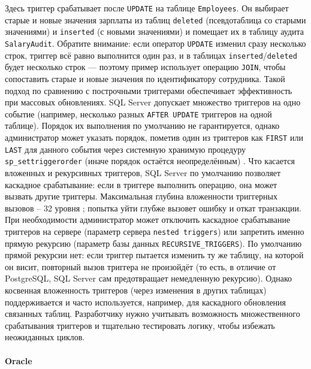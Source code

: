 Здесь триггер срабатывает после \texttt{UPDATE} на таблице \texttt{Employees}. Он выбирает старые и новые значения зарплаты из таблиц \texttt{deleted} (псевдотаблица со старыми значениями) и \texttt{inserted} (с новыми значениями) и помещает их в таблицу аудита \texttt{SalaryAudit}. Обратите внимание: если оператор \texttt{UPDATE} изменил сразу несколько строк, триггер всё равно выполнится один раз, и в таблицах \texttt{inserted}/\texttt{deleted} будет несколько строк — поэтому пример использует операцию \texttt{JOIN}, чтобы сопоставить старые и новые значения по идентификатору сотрудника. Такой подход по сравнению с построчными триггерами обеспечивает эффективность при массовых обновлениях.
SQL Server допускает множество триггеров на одно событие (например, несколько разных \texttt{AFTER UPDATE} триггеров на одной таблице). Порядок их выполнения по умолчанию не гарантируется, однако администратор может указать порядок, пометив один из триггеров как \texttt{FIRST} или \texttt{LAST} для данного события через системную хранимую процедуру \texttt{sp\_settriggerorder} (иначе порядок остаётся неопределённым) \autocite{MicrosoftLearnDDLTrig}.
Что касается вложенных и рекурсивных триггеров, SQL Server по умолчанию позволяет каскадное срабатывание: если в триггере выполнить операцию, она может вызвать другие триггеры. Максимальная глубина вложенности триггерных вызовов – 32 уровня  \autocite{MicrosoftLearnNestTrig}; попытка уйти глубже вызовет ошибку и откат транзакции. При необходимости администратор может отключить каскадное срабатывание триггеров на сервере (параметр сервера \texttt{nested triggers}) или запретить именно прямую рекурсию (параметр базы данных \texttt{RECURSIVE\_TRIGGERS}). По умолчанию прямой рекурсии нет: если триггер пытается изменить ту же таблицу, на которой он висит, повторный вызов триггера не произойдёт (то есть, в отличие от PostgreSQL, SQL Server сам предотвращает немедленную рекурсию). Однако косвенная вложенность триггеров (через изменения в других таблицах) поддерживается и часто используется, например, для каскадного обновления связанных таблиц. Разработчику нужно учитывать возможность множественного срабатывания триггеров и тщательно тестировать логику, чтобы избежать неожиданных циклов.

\paragraph{\textbf{Oracle}} ~\\

